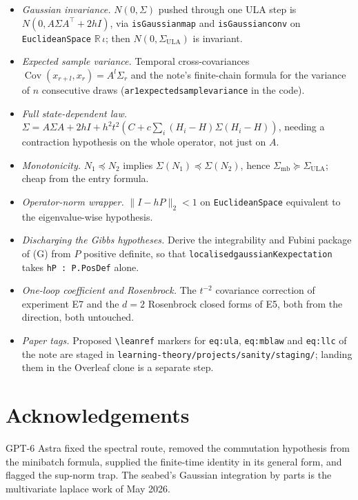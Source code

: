 \documentclass[11pt]{article}
\newcommand{\R}{\mathbb{R}}
\newcommand{\Cov}{\operatorname{Cov}}
\newcommand{\code}[1]{{\def\_{\textunderscore\allowbreak}\texttt{#1}}}
\begin{document}
\begin{itemize}
\item \emph{Gaussian invariance.} $N(0, \Sigma)$ pushed through one ULA
step is $N(0, A\Sigma A^\top + 2hI)$, via \code{isGaussian\_map} and
\code{isGaussian\_conv} on \code{EuclideanSpace} $\R\,\iota$; then
$N(0, \Sigma_{\mathrm{ULA}})$ is invariant.
\item \emph{Expected sample variance.} Temporal cross-covariances
$\Cov(x_{r+l}, x_r) = A^l\Sigma_r$ and the note's finite-chain formula
for the variance of $n$ consecutive draws (\code{ar1\_expected\_sample\_variance}
in the code).
\item \emph{Full state-dependent law.} $\Sigma = A\Sigma A + 2hI +
h^2t^2(C + c\sum_i(H_i - H)\Sigma(H_i - H))$, needing a contraction
hypothesis on the whole operator, not just on $A$.
\item \emph{Monotonicity.} $N_1 \preceq N_2$ implies $\Sigma(N_1) \preceq
\Sigma(N_2)$, hence $\Sigma_{\mathrm{mb}} \succeq \Sigma_{\mathrm{ULA}}$;
cheap from the entry formula.
\item \emph{Operator-norm wrapper.} $\|I - hP\|_2 < 1$ on
\code{EuclideanSpace} equivalent to the eigenvalue-wise hypothesis.
\item \emph{Discharging the Gibbs hypotheses.} Derive the integrability
and Fubini package of (G) from $P$ positive definite, so that
\code{localised\_gaussian\_K\_expectation} takes \code{hP : P.PosDef}
alone.
\item \emph{One-loop coefficient and Rosenbrock.} The $t^{-2}$ covariance
correction of experiment E7 and the $d = 2$ Rosenbrock closed forms of
E5, both from the direction, both untouched.
\item \emph{Paper tags.} Proposed \code{\textbackslash leanref} markers
for \code{eq:ula}, \code{eq:mblaw} and \code{eq:llc} of the note are
staged in \code{learning-theory/projects/sanity/staging/}; landing them
in the Overleaf clone is a separate step.
\end{itemize}

\section*{Acknowledgements}

GPT-6 Astra fixed the spectral route, removed the commutation hypothesis
from the minibatch formula, supplied the finite-time identity in its
general form, and flagged the sup-norm trap. The seabed's Gaussian
integration by parts is the multivariate laplace work of May 2026.
\end{document}

